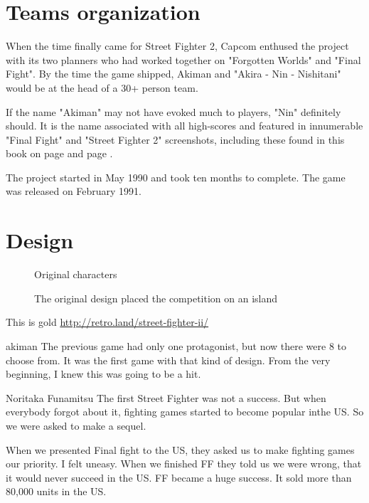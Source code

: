 \section{Teams organization}
When the time finally came for Street Fighter 2, Capcom enthused the project with its two planners who had worked together on "Forgotten Worlds" and "Final Fight". By the time the game shipped, Akiman and "Akira - Nin - Nishitani" would be at the head of a 30+ person team.

\begin{trivia}
If the name "Akiman" may not have evoked much to players, "Nin" definitely should. It is the name associated with all high-scores and featured in innumerable "Final Fight" and "Street Fighter 2" screenshots, including these found in this book on page \pageref{nin_ff} and page \pageref{nin_sf2}.  
\end{trivia}

The project started in May 1990 and took ten months to complete. The game was released on February 1991.






\section{Design}

\begin{figure}[H]
\caption*{Original characters}
\end{figure}

\begin{figure}[H]
\caption*{The original design placed the competition on an island}
\end{figure}

This is gold \url{http://retro.land/street-fighter-ii/}



\begin{q}{akiman\cite{gameMaestro4}}
The previous game had only one protagonist, but now there were 8 to choose from. It was the first game with that kind of design. From the very beginning, I knew this was going to be a hit.
\end{q}


\begin{q}{Noritaka Funamitsu\cite{retro}}
  The first Street Fighter was not a success. But when everybody forgot about it, fighting games started to become popular inthe US. So we were asked to make a sequel.

  When we presented Final fight to the US, they asked us to make fighting games our priority. I felt uneasy. When we finished FF they told us we were wrong, that it would never succeed in the US. FF became a huge success. It sold more than 80,000 units in the US.
\end{q}



